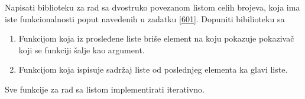 \begin{Exercise}[label=603]
Napisati biblioteku za rad sa dvostruko povezanom listom celih brojeva, koja ima iste funkcionalnosti poput navedenih u zadatku \ref{601}. 
Dopuniti bibilioteku sa 
\begin{enumerate}
 \item Funkcijom koja iz prosleđene liste briše element na koju pokazuje pokazivač koji se funkciji šalje kao argument.
 \item Funkcijom koja ispisuje sadržaj liste od poslednjeg elementa ka glavi liste.
\end{enumerate}

Sve funkcije za rad sa listom implementirati iterativno.
\end{Exercise}
\begin{Answer}[ref=603]
\end{Answer}

